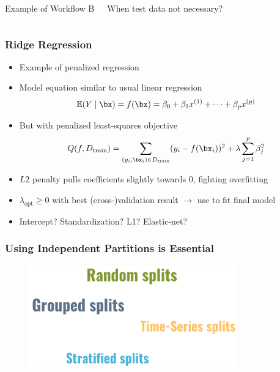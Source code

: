 \begin{frame}
	\begin{columns}
		\begin{exampleblock}{Example of Workflow B}
		\end{exampleblock}
		
		\alert{When test data not necessary?}
	\end{columns}
\end{frame}

\begin{frame}
	\frametitle{Ridge Regression}
	\begin{itemize}
		\item Example of \alert{penalized} regression
		\item Model equation similar to usual linear regression
		$$
		\mathbb E(Y \mid \bx) = f(\bx) = \beta_0 + \beta_1 x^{(1)} + \dots + \beta_p x^{(p)}
		$$
		\item But with penalized least-squares objective
		$$
		Q(f, D_{\text{train}}) = \sum_{(y_i, \bx_i) \in D_\text{train}} (y_i - f(\bx_i))^2 + \lambda \sum_{j = 1}^p  \beta_j^2
		$$
		\item $L2$ penalty pulls coefficients slightly towards 0, fighting overfitting
		\item $\lambda_\text{opt} \ge 0$ with best (cross-)validation result $\rightarrow$ use to fit final model
		\item Intercept? Standardization? L1? Elastic-net?
	\end{itemize}
	
	\vfill
	
	\begin{example}
	\end{example}
\end{frame}

\begin{frame}
	\frametitle{Using Independent Partitions is Essential}
	\begin{figure}
		\includegraphics[width=0.8\textwidth]{pics/validation_independent.png}
	\end{figure}
\end{frame}

